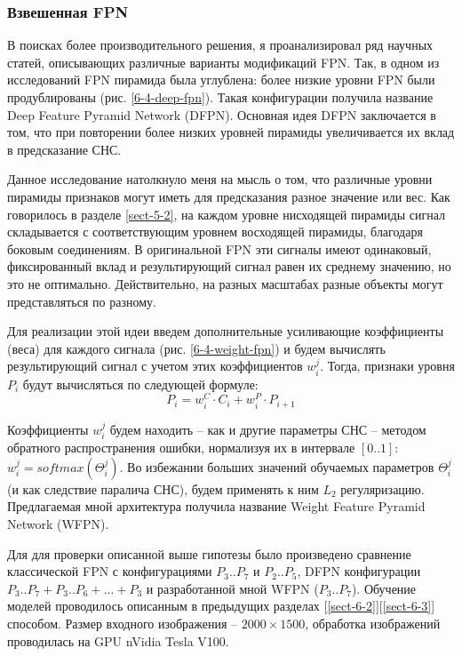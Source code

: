 \subsubsection{Взвешенная FPN} \label{sect-wfpn}

В поисках более производительного решения, я проанализировал ряд научных статей, описывающих различные варианты модификаций FPN. Так, в одном из исследований \cite{lib-dfpn} FPN пирамида была углублена: более низкие уровни FPN были продублированы (рис. \ref{6-4-deep-fpn}). Такая конфигурации получила название Deep Feature Pyramid Network (DFPN). Основная идея DFPN заключается в том, что при повторении более низких уровней пирамиды увеличивается их вклад в предсказание СНС.


Данное исследование натолкнуло меня на мысль о том, что различные уровни пирамиды признаков могут иметь для предсказания разное значение или вес. Как говорилось в разделе \ref{sect-5-2}, на каждом уровне нисходящей пирамиды сигнал складывается с соответствующим уровнем восходящей пирамиды, благодаря боковым соединениям. В оригинальной FPN эти сигналы имеют одинаковый, фиксированный вклад и результирующий сигнал равен их среднему значению, но это не оптимально. Действительно, на разных масштабах разные объекты могут представляться по разному. 

Для реализации этой идеи введем дополнительные усиливающие коэффициенты (веса) для каждого сигнала (рис. \ref{6-4-weight-fpn}) и будем вычислять результирующий сигнал с учетом этих коэффициентов $w^{j}_{i}$. Тогда, признаки уровня $P_i$ будут вычисляться по следующей формуле:
$$
P_i = w^{C}_i \cdot C_i + w^{P}_i \cdot P_{i+1}
$$

Коэффициенты $w^{j}_{i}$ будем находить -- как и другие параметры СНС -- методом обратного распространения ошибки, нормализуя их в интервале $[0..1]$: $w^{j}_{i} = softmax(\Theta^{j}_{i})$. Во избежании больших значений обучаемых параметров $\Theta^{j}_{i}$ (и как следствие паралича СНС), будем применять к ним $L_2$ регуляризацию. Предлагаемая мной архитектура получила название Weight Feature Pyramid Network (WFPN).


Для для проверки описанной выше гипотезы было произведено сравнение классической FPN с конфигурациями $P_3..P_7$ и $P_2..P_5$, DFPN конфигурации $P_3..P_7 + P_3..P_6 + ... + P_3$ и разработанной мной WFPN ($P_3..P_7$). Обучение моделей проводилось описанным в предыдущих разделах [\ref{sect-6-2}][\ref{sect-6-3}] способом. Размер входного изображения -- $2000\times1500$, обработка изображений проводилась на GPU nVidia Tesla V100.

